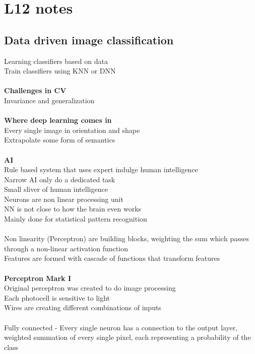\documentclass[11pt]{article}
\begin{document}
\section*{L12 notes}
\subsection*{Data driven image classification}
Learning classifiers based on data\\
Train classifiers using KNN or DNN\\\\
\textbf{Challenges in CV}\\
Invariance and generalization
\\\\
\textbf{Where deep learning comes in}\\
Every single image in orientation and shape\\
Extrapolate some form of semantics\\
\\
\textbf{AI}\\
Rule based system that uses expert indulge human intelligence
\\
Narrow AI only do a dedicated task\\
Small sliver of human intelligence
\\
Neurons are non linear processing unit
\\
NN is not close to how the brain even works
\\
Mainly done for statistical pattern recognition
\\\\
Non linearity (Perceptron) are building blocks, weighting the sum which passes through a non-linear activation function
\\
Features are formed with cascade of functions that transform features
\\\\
\textbf{Perceptron Mark I}\\
Original perceptron was created to do image processing\\
Each photocell is sensitive to light\\
Wires are creating different combinations of inputs\\\\
Fully connected - Every single neuron has a connection to the output layer, weighted summation of every single pixel, each representing a probability of the class\\
\\
\end{document}
